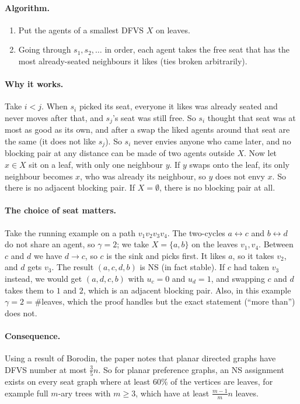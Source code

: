 \documentclass[11pt,a4paper]{article}
\theoremstyle{definition}
\theoremstyle{remark}
\theoremstyle{plain}
\begin{document}
\paragraph{Algorithm.}
\begin{enumerate}
  \item Put the agents of a smallest DFVS $X$ on leaves.
  \item Going through $s_1,s_2,\dots$ in order, each agent takes the free seat that has the most already-seated neighbours it likes (ties broken arbitrarily).
\end{enumerate}

\paragraph{Why it works.} Take $i<j$. When $s_i$ picked its seat, everyone it likes was already seated and never moves after that, and $s_j$'s seat was still free. So $s_i$ thought that seat was at most as good as its own, and after a swap the liked agents around that seat are the same (it does not like $s_j$). So $s_i$ never envies anyone who came later, and no blocking pair at any distance can be made of two agents outside $X$. Now let $x\in X$ sit on a leaf, with only one neighbour $y$. If $y$ swaps onto the leaf, its only neighbour becomes $x$, who was already its neighbour, so $y$ does not envy $x$. So there is no adjacent blocking pair. If $X=\emptyset$, there is no blocking pair at all.

\paragraph{The choice of seat matters.} Take the running example on a path $v_1v_2v_3v_4$. The two-cycles $a\leftrightarrow c$ and $b\leftrightarrow d$ do not share an agent, so $\gamma=2$; we take $X=\{a,b\}$ on the leaves $v_1,v_4$. Between $c$ and $d$ we have $d\to c$, so $c$ is the sink and picks first. It likes $a$, so it takes $v_2$, and $d$ gets $v_3$. The result $(a,c,d,b)$ is NS (in fact stable). If $c$ had taken $v_3$ instead, we would get $(a,d,c,b)$ with $u_c=0$ and $u_d=1$, and swapping $c$ and $d$ takes them to $1$ and $2$, which is an adjacent blocking pair. Also, in this example $\gamma=2=\#$leaves, which the proof handles but the exact statement (``more than'') does not.

\paragraph{Consequence.} Using a result of Borodin, the paper notes that planar directed graphs have DFVS number at most $\tfrac35n$. So for planar preference graphs, an NS assignment exists on every seat graph where at least $60\%$ of the vertices are leaves, for example full $m$-ary trees with $m\ge3$, which have at least $\frac{m-1}{m}n$ leaves.
\end{document}
